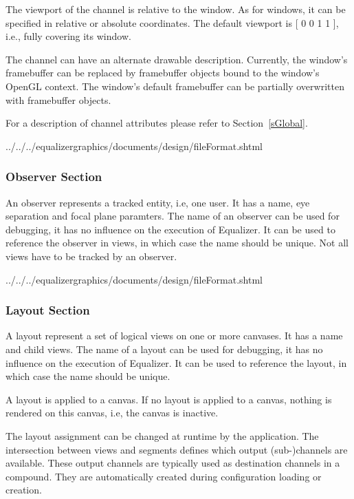 \documentclass[10pt,a4]{scrartcl}
\newcommand{\sref}[1]{Section~\ref{#1}}
\begin{document}
The viewport of the channel is relative to the window. As for windows,
it can be specified in relative or absolute coordinates. The default
viewport is \textsf{[ 0 0 1 1 ]}, i.e., fully covering its window.

The channel can have an alternate drawable description. Currently, the
window's framebuffer can be replaced by framebuffer objects bound to the
window's OpenGL context. The window's default framebuffer can be
partially overwritten with framebuffer objects.

For a description of channel attributes please refer to \sref{sGlobal}.

{\footnotesize
  {../../../equalizergraphics/documents/design/fileFormat.shtml}}

\subsubsection{Observer Section}

An observer represents a tracked entity, i.e, one user. It has a name, eye
separation and focal plane paramters. The name of an observer can be used for
debugging, it has no influence on the execution of Equalizer. It can be used to
reference the observer in views, in which case the name should be unique. Not
all views have to be tracked by an observer.

{\footnotesize
  {../../../equalizergraphics/documents/design/fileFormat.shtml}}

\subsubsection{Layout Section}

A layout represent a set of logical views on one or more canvases. It
has a name and child views. The name of a layout can be used for
debugging, it has no influence on the execution of Equalizer. It can be
used to reference the layout, in which case the name should be unique.

A layout is applied to a canvas. If no layout is applied to a canvas,
nothing is rendered on this canvas, i.e, the canvas is inactive.

The layout assignment can be changed at runtime by the application. The
intersection between views and segments defines which output
(sub-)channels are available. These output channels are typically used
as destination channels in a compound. They are automatically created
during configuration loading or creation.
\end{document}
